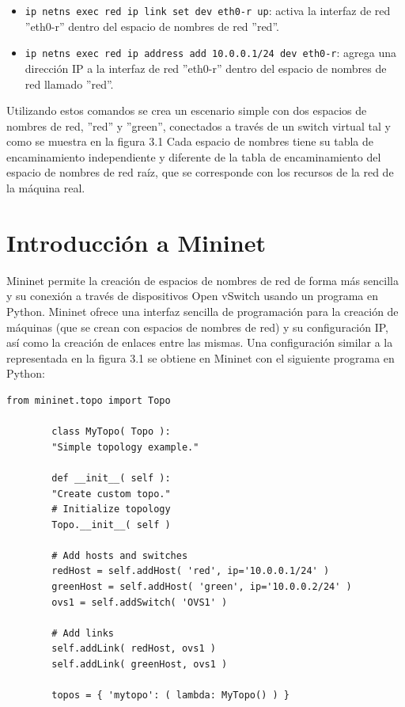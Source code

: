 \documentclass[a4paper, 12pt]{book}
\begin{document}
\begin{itemize}
		\item \verb*|ip netns exec red ip link set dev eth0-r up|: activa la interfaz de red ''eth0-r'' dentro del espacio de nombres de red ''red''.
		
		\item \verb*|ip netns exec red ip address add 10.0.0.1/24 dev eth0-r|: agrega una dirección IP a la interfaz de red ''eth0-r'' dentro del espacio de nombres de red llamado ''red''.
		
		
		
		
		
		
	
	\end{itemize}
	
	Utilizando estos comandos se crea un escenario simple con dos espacios de nombres de red, ''red'' y ''green'', conectados a través de un switch virtual tal y como se muestra en la figura 3.1 Cada espacio de nombres tiene su tabla de encaminamiento independiente y diferente de la tabla de encaminamiento del espacio de nombres de red raíz, que se corresponde con los recursos de la red de la máquina real.
	

	
	
	\section{Introducción a Mininet}
	
	Mininet permite la creación de espacios de nombres de red de forma más sencilla y su conexión a través
	de dispositivos Open vSwitch usando un programa en Python. Mininet ofrece una interfaz sencilla
	de programación para la creación de máquinas (que se crean con espacios de nombres de red) y su
	configuración IP, así como la creación de enlaces entre las mismas.
	Una configuración similar a la representada en la figura 3.1 se obtiene en Mininet con el siguiente
	programa en Python:
	
	 \begin{lstlisting}[caption={Ejemplo de topología simple en Mininet}, label={lst:mytopo}]
	 	from mininet.topo import Topo
	 	
	 	class MyTopo( Topo ):
	 	"Simple topology example."
	 	
	 	def __init__( self ):
	 	"Create custom topo."
	 	# Initialize topology
	 	Topo.__init__( self )
	 	
	 	# Add hosts and switches
	 	redHost = self.addHost( 'red', ip='10.0.0.1/24' )
	 	greenHost = self.addHost( 'green', ip='10.0.0.2/24' )
	 	ovs1 = self.addSwitch( 'OVS1' )
	 	
	 	# Add links
	 	self.addLink( redHost, ovs1 )
	 	self.addLink( greenHost, ovs1 )
	 	
	 	topos = { 'mytopo': ( lambda: MyTopo() ) }
	 \end{lstlisting}
	
\end{document}
